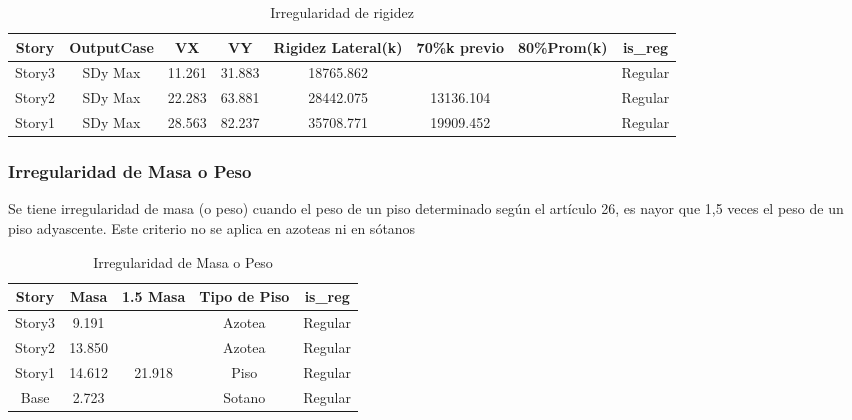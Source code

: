\documentclass{article}%
\begin{document}
%


\begin{table}[h!]%
\centering%
\caption{Irregularidad de rigidez}%
\begin{tabular}{cccccccc}
\toprule
Story & OutputCase & VX & VY & Rigidez Lateral(k) & 70\%k previo & 80\%Prom(k) & is\_reg \\
\midrule
Story3 & SDy Max & 11.261 & 31.883 & 18765.862 &  &  & Regular \\
Story2 & SDy Max & 22.283 & 63.881 & 28442.075 & 13136.104 &  & Regular \\
Story1 & SDy Max & 28.563 & 82.237 & 35708.771 & 19909.452 &  & Regular \\
\bottomrule
\end{tabular}
%
\end{table}

%
\subsubsection{Irregularidad de Masa o Peso}%
\label{ssubsec:IrregularidaddeMasaoPeso}%
\begin{tcolorbox}[colback=gray!5!white,colframe=cyan!75!black,fonttitle=\bfseries,title=Tabla N°9 E-030]%
Se tiene irregularidad de masa (o peso) cuando el peso de un piso determinado según el artículo 26, es nayor que 1,5 veces el peso de un piso adyascente. Este criterio no se aplica en azoteas ni en sótanos%
\end{tcolorbox}%
%


\begin{table}[h!]%
\centering%
\caption{Irregularidad de Masa o Peso}%
\begin{tabular}{ccccc}
\toprule
Story & Masa & 1.5 Masa & Tipo de Piso & is\_reg \\
\midrule
Story3 & 9.191 &  & Azotea & Regular \\
Story2 & 13.850 &  & Azotea & Regular \\
Story1 & 14.612 & 21.918 & Piso & Regular \\
Base & 2.723 &  & Sotano & Regular \\
\bottomrule
\end{tabular}
%
\end{table}

%
\newpage%
\end{document}
